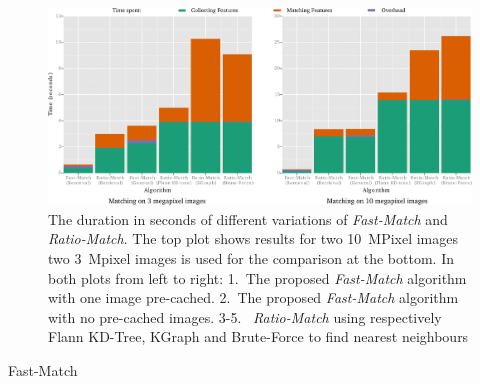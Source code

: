 \documentclass[runningheads]{llncs}
\begin{document}
\begin{figure}[tb]
    \centering
    \includegraphics[width=1\columnwidth]{images/timings}
    \caption{The duration in seconds of different variations of \emph{Fast-Match} and \emph{Ratio-Match}. The top plot shows results for two 10~MPixel images two 3~Mpixel images is used for the comparison at the bottom. In both plots from left to right: 1.~The proposed \emph{Fast-Match} algorithm with one image pre-cached. 2.~The proposed \emph{Fast-Match} algorithm with no pre-cached images. 3-5.~ \emph{Ratio-Match} using respectively Flann KD-Tree, KGraph and Brute-Force to find nearest neighbours}
    \label{fig:timings}
\end{figure}

\begin{algorithm}[htb]
\caption{Fast-Match}
\label{alg-fast}
\end{algorithm}
\end{document}
